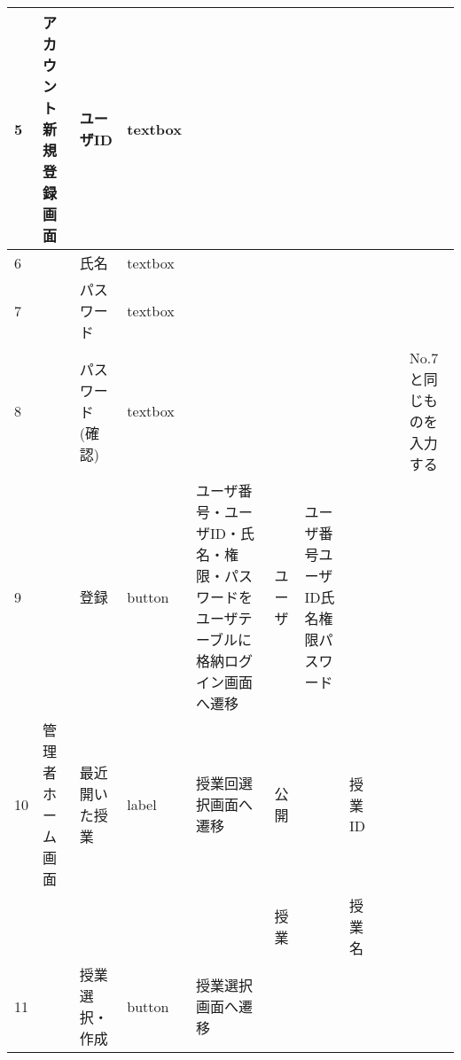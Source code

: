 \begin{landscape}
\begin{table}[]
\begin{tabular}{|l|l|l|l|l|l|l|l|l|l|l|}
5   & アカウント新規登録画面   & ユーザID            & textbox  &                                                                   &         &                       &                    &                 &                               &                                                                \\ \hline
6   &               & 氏名               & textbox  &                                                                   &         &                       &                    &                 &                               &                                                                \\ \hline
7   &               & パスワード            & textbox  &                                                                   &         &                       &                    &                 &                               &                                                                \\ \hline
8   &               & パスワード(確認)        & textbox  &                                                                   &         &                       &                    &                 &                               & No.7と同じものを入力する                                                 \\ \hline
9   &               & 登録               & button   & ユーザ番号・ユーザID・氏名・権限・パスワードをユーザテーブルに格納ログイン画面へ遷移                       & ユーザ     & ユーザ番号ユーザID氏名権限パスワード   &                    &                 &                               &                                                                \\ \hline
10  & 管理者ホーム画面      & 最近開いた授業          & label    & 授業回選択画面へ遷移                                                        & 公開      &                       & 授業ID               &                 &                               &                                                                \\ \hline
    &               &                  &          &                                                                   & 授業      &                       & 授業名                &                 &                               &                                                                \\ \hline
11  &               & 授業選択・作成          & button   & 授業選択画面へ遷移                                                         &         &                       &                    &                 &                               &                                                                \\ \hline

\end{tabular}
\end{table}
\end{landscape}
